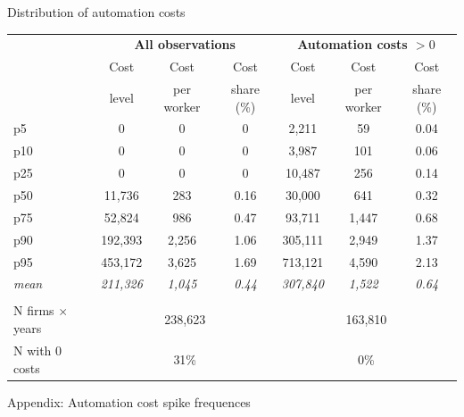 \documentclass[aspectratio=169]{beamer}
\begin{document}
\begin{frame}{Distribution of automation costs \hyperlink{des_autom_time}{}} \label{des_autom}
\footnotesize
\noindent \begin{table}[t!]
  \centering
    \begin{threeparttable}
    \begin{tabular}{lcccccc}
    \toprule
    \addlinespace
          & \multicolumn{3}{c}{\textbf{All observations}} & \multicolumn{3}{c}{\textbf{Automation costs $>0$}} \\
          & Cost  & Cost  & Cost  & Cost  & Cost  & Cost \\
          & level & per worker & share (\%) & level & per worker & share (\%) \\
    \midrule      
    p5    & 0     & 0     & 0     & 2,211 & 59    & 0.04 \\
    p10   & 0     & 0     & 0     & 3,987 & 101   & 0.06 \\
    p25   & 0     & 0     & 0     & 10,487 & 256   & 0.14 \\
    p50   & 11,736 & 283   & 0.16  & 30,000 & 641   & 0.32 \\
    p75   & 52,824 & 986   & 0.47  & 93,711 & 1,447 & 0.68 \\
    p90   & 192,393 & 2,256 & 1.06  & 305,111 & 2,949 & 1.37 \\
    p95   & 453,172 & 3,625 & 1.69  & 713,121 & 4,590 & 2.13 \\
    \textit{mean} & \textit{211,326} & \textit{1,045} & \textit{0.44} & \textit{307,840} & \textit{1,522} & \textit{0.64} \\
          &       &       &       &       &  \\
    \multicolumn{1}{l}{N firms $\times$ years} & \multicolumn{3}{c}{238,623} & \multicolumn{3}{c}{163,810} \\
    N with 0 costs & \multicolumn{3}{c}{31\%} & \multicolumn{3}{c}{0\%} \\
    \bottomrule
    \end{tabular}%
  \end{threeparttable}
\end{table}
\end{frame}

\begin{frame}
\begin{center}
{\Large Appendix: Automation cost spike frequences}
\end{center}
\end{frame}
\end{document}
